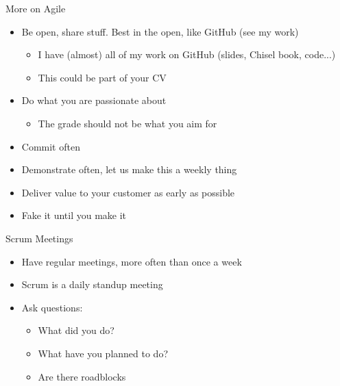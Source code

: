 \begin{frame}[fragile]{More on Agile}
\begin{itemize}
\item Be open, share stuff. Best in the open, like GitHub (see my work)
\begin{itemize}
\item I have (almost) all of my work on GitHub (slides, Chisel book, code...)
\item This could be part of your CV
\end{itemize}
\item Do what you are passionate about
\begin{itemize}
\item The grade should not be what you aim for
\end{itemize}
\item Commit often
\item Demonstrate often, let us make this a weekly thing
\item Deliver value to your customer as early as possible
\item Fake it until you make it
\end{itemize}
\end{frame}

\begin{frame}[fragile]{Scrum Meetings}
\begin{itemize}
\item Have regular meetings, more often than once a week
\item Scrum is a daily standup meeting
\item Ask questions:
\begin{itemize}
\item What did you do?
\item What have you planned to do?
\item Are there roadblocks
\end{itemize}
\end{itemize}
\end{frame}

